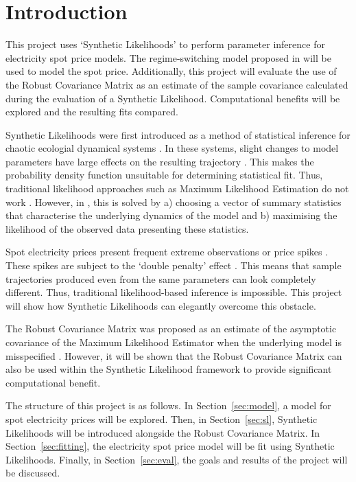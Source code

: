\section{Introduction}

This project uses `Synthetic Likelihoods' \citep{wood_2010} to perform parameter inference for electricity spot price models. The regime-switching model proposed in \cite{huisman_mahieu_2003} will be used to model the spot price. Additionally, this project will evaluate the use of the Robust Covariance Matrix \citep{huber_1967} as an estimate of the sample covariance calculated during the evaluation of a Synthetic Likelihood. Computational benefits will be explored and the resulting fits compared.

Synthetic Likelihoods were first introduced as a method of statistical inference for chaotic ecologial dynamical systems \citep{wood_2010}. In these systems, slight changes to model parameters have large effects on the resulting trajectory \citep{may_1976}. This makes the probability density function unsuitable for determining statistical fit. Thus, traditional likelihood approaches such as Maximum Likelihood Estimation do not work \citep{wood_2010}. However, in \cite{wood_2010}, this is solved by a) choosing a vector of summary statistics that characterise the underlying dynamics of the model and b) maximising the likelihood of the observed data presenting these statistics.

Spot electricity prices present frequent extreme observations or price spikes \citep[p.~21]{pilipovic_2007}. These spikes are subject to the `double penalty' effect \citep{haben_2014}. This means that sample trajectories produced even from the same parameters can look completely different. Thus, traditional likelihood-based inference is impossible. This project will show how Synthetic Likelihoods can elegantly overcome this obstacle.

The Robust Covariance Matrix was proposed as an estimate of the asymptotic covariance of the Maximum Likelihood Estimator when the underlying model is misspecified \citep{huber_1967}. However, it will be shown that the Robust Covariance Matrix can also be used within the Synthetic Likelihood framework to provide significant computational benefit.

The structure of this project is as follows. In Section~\ref{sec:model}, a model for spot electricity prices will be explored. Then, in Section~\ref{sec:sl}, Synthetic Likelihoods will be introduced alongside the Robust Covariance Matrix. In Section~\ref{sec:fitting}, the electricity spot price model will be fit using Synthetic Likelihoods. Finally, in Section~\ref{sec:eval}, the goals and results of the project will be discussed.